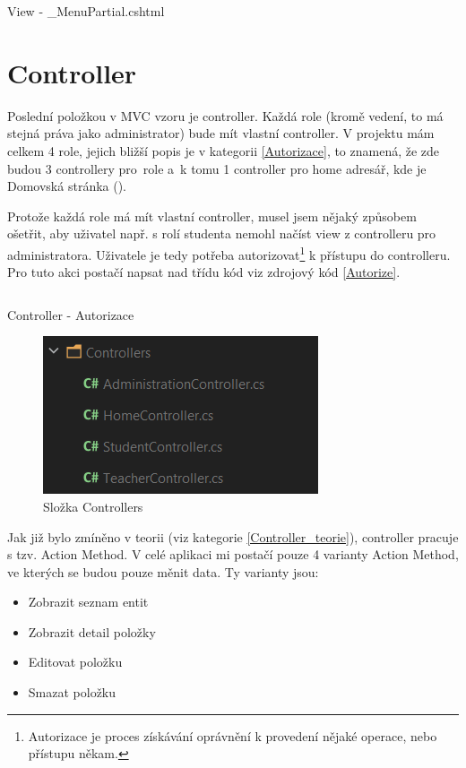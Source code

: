 \documentclass[a4paper, 12pt]{report}
\begin{document}
	\begin{listing}[H]
		\inputminted{html}{SourceCode/Views/Shared/_MenuPartial.html}
		\caption{View - \_MenuPartial.cshtml}
		\label{sharedmenupartial}
	\end{listing}

	\section{Controller}
	Poslední položkou v MVC vzoru je controller. Každá role (kromě vedení, to má stejná práva jako administrator) bude mít vlastní controller. V projektu mám celkem 4 role, jejich bližší popis je v kategorii \ref{Autorizace}, to znamená, že zde budou 3 controllery pro~role a~k tomu 1 controller pro home adresář, kde je Domovská stránka ().\par
	Protože každá role má mít vlastní controller, musel jsem nějaký způsobem ošetřit, aby uživatel např. s rolí studenta nemohl načíst view z controlleru pro administratora. Uživatele je tedy potřeba autorizovat\footnote{Autorizace je proces získávání oprávnění k provedení nějaké operace, nebo přístupu někam.\cite{Autorizace}} k přístupu do controlleru. Pro tuto akci postačí napsat nad třídu kód viz zdrojový kód \ref{Autorize}.
	\begin{listing}[H]
		\inputminted{csharp}{SourceCode/Controllers/Autorize.cs}
		\caption{Controller - Autorizace}
		\label{Autorize}
	\end{listing}
	\begin{figure}[H]
		\centering
		\includegraphics[scale=1]{Contollers}
		\caption{Složka Controllers}
		\label{Controllers}
	\end{figure}
	Jak již bylo zmíněno v teorii (viz kategorie \ref{Controller_teorie}), controller pracuje s tzv. Action Method. V celé aplikaci mi postačí pouze 4 varianty Action Method, ve kterých se budou pouze měnit data. Ty varianty jsou:
	\begin{itemize}
		\item Zobrazit seznam entit
		\item Zobrazit detail položky
		\item Editovat položku
		\item Smazat položku
	\end{itemize}\par
\end{document}
